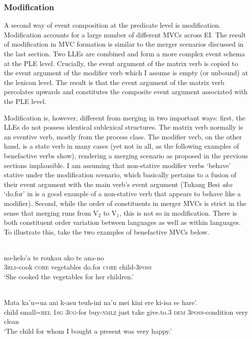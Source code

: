 \subsubsection{Modification}
\label{sec:modification}

A second way of event composition at the predicate level is modification. Modification accounts for a large number of different MVCs across EI. The result of modification in MVC formation is similar to the merger scenarios discussed in the last section. Two LLEs are combined and form a more complex event schema at the PLE level. Crucially, the event argument of the matrix verb is copied to the event argument of the modifier verb which I assume is empty (or unbound) at the lexicon level. The result is that the event argument of the matrix verb percolates upwards and constitutes the composite event argument associated with the PLE level.

Modification is, however, different from merging in two important ways: first, the LLEs do not possess identical sublexical structures. The matrix verb normally is an eventive verb, mostly from the process class. The modifier verb, on the other hand, is a state verb in many cases (yet not in all, as the following examples of benefactive verbs show), rendering a merging scenario as proposed in the previous sections implausible. I am assuming that non-stative modifier verbs `behave' stative under the modification scenario, which basically pertains to a fusion of their event argument with the main verb's event argument (Tukang Besi \textit{ako} `do.for' in  is a good example of a non-stative verb that appears to behave like a modifier). Second, while the order of constituents in merger MVCs is strict in the sense that merging runs from V$_2$ to V$_1$, this is not so in modification. There is both constituent order variation between languages as well as within languages. To illustrate this, take the two examples of benefactive MVCs below.

\ea \label{Tukang_3}
\\
\gll no-helo'a te roukau ako te ana-no \\
3\textsc{rls}-cook \textsc{core} vegetables do.for \textsc{core} child-3\textsc{poss} \\
\glft `She cooked the vegetables for her children.' \\ 
\z

\ea \label{Makalero_2}
\\
\gll Mata ka’u=ua ani k-asu teuh-ini na’u mei kini ere ki-isa se hare’. \\
child small=\textsc{rel} 1\textsc{sg} 3\textsc{ug}-for buy-\textsc{nmlz} just take give.to.3 \textsc{dem} 3\textsc{poss}-condition very clean \\
\glft `The child for whom I bought a present was very happy.' \\ 
\z

